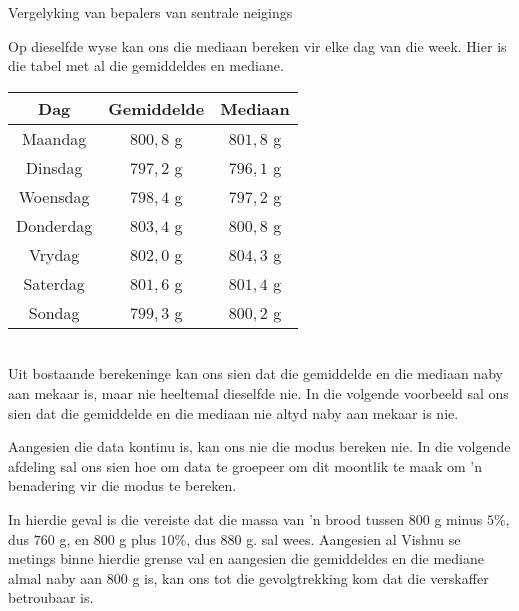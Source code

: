\begin{wex}{
Vergelyking van bepalers van sentrale neigings
}
{  Op dieselfde wyse kan ons die mediaan bereken vir elke dag van die week. Hier is die tabel met al die gemiddeldes en mediane. 
\\
  \begin{center}
    \begin{tabular}{|c|c|c|} \hline
      \textbf{Dag} & \textbf{Gemiddelde} &\textbf{Mediaan} \\  \hline
      Maandag & $800,8$ g & $801,8$ g \\ \hline
      Dinsdag & $797,2$ g & $796,1$ g \\ \hline
      Woensdag & $798,4$ g & $797,2$ g \\ \hline
      Donderdag & $803,4$ g & $800,8$ g \\ \hline
      Vrydag & $802,0$ g & $804,3$ g \\ \hline
      Saterdag & $801,6$ g & $801,4$ g \\ \hline
      Sondag & $799,3$ g & $800,2$ g \\ \hline
    \end{tabular}
  \end{center}
\vspace{8pt}\\
  Uit bostaande berekeninge kan ons sien dat die gemiddelde en die mediaan naby aan mekaar is, maar nie heeltemal dieselfde nie. In die volgende voorbeeld sal ons sien dat die gemiddelde en die mediaan nie altyd naby aan mekaar is nie.


  Aangesien die data kontinu is, kan ons nie die modus bereken nie. In die volgende afdeling sal ons sien hoe om data te groepeer om dit moontlik te maak om ’n benadering vir die modus te bereken.


  In hierdie geval is die vereiste dat die massa van ’n brood tussen $800$ g minus $5$\%, dus $760$ g, en $800$ g plus 
  $10$\%, dus $880$ g. sal wees. Aangesien al Vishnu se metings binne hierdie grense val en aangesien die gemiddeldes en die mediane almal naby aan $800$ g is, kan ons tot die gevolgtrekking kom dat die verskaffer betroubaar is.
}
\end{wex}


